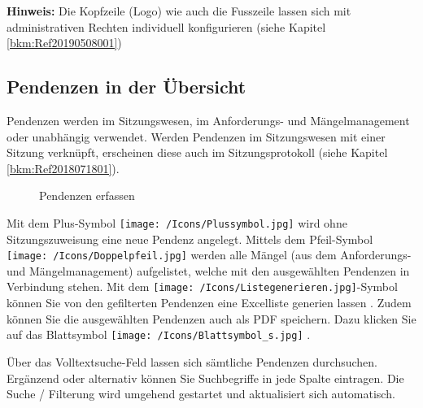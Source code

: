 \textbf{Hinweis:} Die Kopfzeile (Logo) wie auch die Fusszeile lassen sich mit administrativen Rechten individuell konfigurieren (siehe Kapitel \ref{bkm:Ref20190508001})

\clearpage
\subsection{Pendenzen in der Übersicht}
\label{bkm:Ref2018071802}

Pendenzen werden im Sitzungswesen, im Anforderungs- und Mängelmanagement oder unabhängig verwendet. Werden Pendenzen im Sitzungswesen mit einer Sitzung verknüpft, erscheinen diese auch im  Sitzungsprotokoll (siehe Kapitel \ref{bkm:Ref2018071801}).

\begin{figure}[H]
\caption{Pendenzen erfassen}
\end{figure}

Mit dem Plus-Symbol \texttt{[image: /Icons/Plussymbol.jpg]}  wird ohne Sitzungszuweisung eine neue Pendenz angelegt. Mittels dem Pfeil-Symbol \texttt{[image: /Icons/Doppelpfeil.jpg]}  werden alle Mängel (aus dem Anforderungs- und Mängelmanagement) aufgelistet, welche mit den ausgewählten Pendenzen in Verbindung stehen. Mit dem \texttt{[image: /Icons/Listegenerieren.jpg]}-Symbol können Sie von den gefilterten Pendenzen eine Excelliste generien lassen . Zudem können Sie die ausgewählten Pendenzen auch als PDF speichern. Dazu klicken Sie auf das Blattsymbol \texttt{[image: /Icons/Blattsymbol\_s.jpg]} .

\vspace{\baselineskip}

Über das Volltextsuche-Feld  lassen sich sämtliche Pendenzen durchsuchen. Ergänzend oder alternativ können Sie Suchbegriffe in jede Spalte eintragen. Die Suche / Filterung wird umgehend gestartet und aktualisiert sich automatisch.

